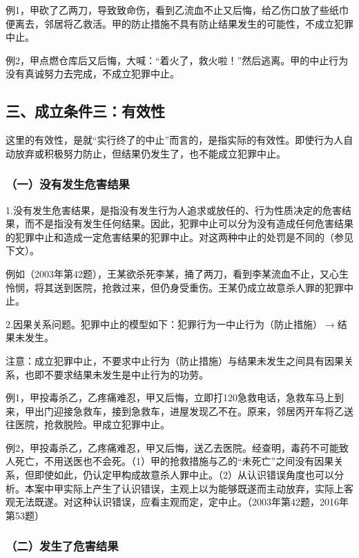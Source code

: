例1，甲砍了乙两刀，导致致命伤，看到乙流血不止又后悔，给乙伤口放了些纸巾便离去，邻居将乙救活。甲的防止措施不具有防止结果发生的可能性，不成立犯罪中止。

例2，甲点燃仓库后又后悔，大喊：“着火了，救火啦！”然后逃离。甲的中止行为没有真诚努力去完成，不成立犯罪中止。


\subsection*{三、成立条件三：有效性}

这里的有效性，是就“实行终了的中止”而言的，是指实际的有效性。即使行为人自动放弃或积极努力防止，但结果仍发生了，也不能成立犯罪中止。

\subsubsection*{（一）没有发生危害结果}

1.没有发生危害结果，是指没有发生行为人追求或放任的、行为性质决定的危害结果，而不是指没有发生任何结果。因此，犯罪中止可以分为没有造成任何危害结果的犯罪中止和造成一定危害结果的犯罪中止。对这两种中止的处罚是不同的（参见下文）。

例如（2003年第42题），王某欲杀死李某，捅了两刀，看到李某流血不止，又心生怜悯，将其送到医院，抢救过来，但仍身受重伤。王某仍成立故意杀人罪的犯罪中止。

2.因果关系问题。犯罪中止的模型如下：犯罪行为一中止行为（防止措施）\ensuremath{\rightarrow}结果未发生。

注意：成立犯罪中止，不要求中止行为（防止措施）与结果未发生之间具有因果关系，也即不要求结果未发生是中止行为的功劳。

例1，甲投毒杀乙，乙疼痛难忍，甲又后悔，立即打120急救电话，急救车马上到来，甲出门迎接急救车，接到急救车，进屋发现乙不在。原来，邻居丙开车将乙送往医院，抢救脱险。甲成立犯罪中止。

例2，甲投毒杀乙，乙疼痛难忍，甲又后悔，送乙去医院。经查明，毒药不可能致人死亡，不用送医也不会死。（1）甲的抢救措施与乙的“未死亡”之间没有因果关系，但即使如此，仍认定甲构成故意杀人罪中止。（2）从认识错误角度也可以分析。本案中甲实际上产生了认识错误，主观上以为能够既遂而主动放弃，实际上客观无法既遂。对这种认识错误，应看主观而定，定中止。（2003年第42题，2016年第53题）

\subsubsection*{（二）发生了危害结果}

